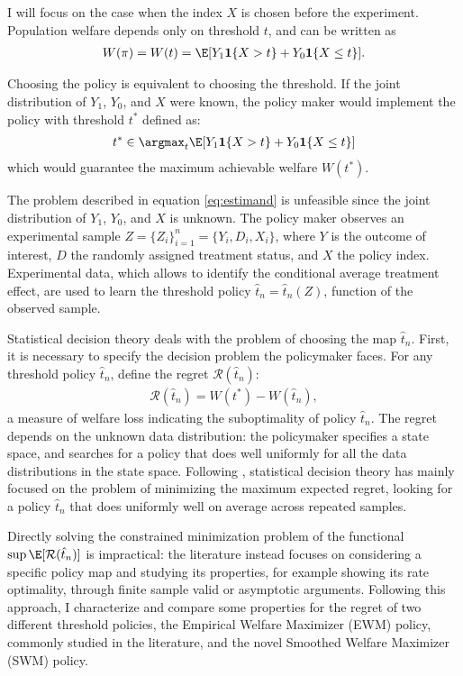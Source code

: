 {I will focus on the case when the index $X$ is chosen before the experiment. Population welfare depends only on threshold $t$, and can be written as
\begin{gather}
    W(\pi) = W(t) = \E[Y_1\mathbf{1}\{X > t\} + Y_0\mathbf{1}\{X \leq t\}]. 
\end{gather}

Choosing the policy is equivalent to choosing the threshold. If the joint distribution of $Y_1$, $Y_0$, and $X$ were known, the policy maker would implement the policy with threshold $t^*$ defined as:
\begin{gather} \label{eq:estimand}
    t^* \in \argmax_{t} \E[Y_1\mathbf{1}\{X> t\} + Y_0\mathbf{1}\{X \leq t\}]
\end{gather}
which would guarantee the maximum achievable welfare $W(t^*)$.

The problem described in equation \eqref{eq:estimand} is unfeasible since the joint distribution of $Y_1$, $Y_0$, and $X$ is unknown. The policy maker observes an experimental sample $Z=\{Z_i\}_{i=1}^n=\{Y_i,D_i,X_i\}$, where $Y$ is the outcome of interest, $D$ the randomly assigned treatment status, and $X$ the policy index. Experimental data, which allows to identify the conditional average treatment effect, are used to learn the threshold policy $\hat{t}_n = \hat{t}_n(Z)$, function of the observed sample.

Statistical decision theory deals with the problem of choosing the map $\hat{t}_n$. First, it is necessary to specify the decision problem the policymaker faces. For any threshold policy $\hat{t}_n$, define the regret $\mathcal{R}(\hat{t}_n)$:
\begin{gather}
    \mathcal{R}(\hat{t}_n) = W(t^*) - W(\hat{t}_n),
\end{gather}
a measure of welfare loss indicating the suboptimality of policy $\hat{t}_n$. The regret depends on the unknown data distribution: the policymaker specifies a state space, and searches for a policy that does well uniformly for all the data distributions in the state space. Following \cite{manski2004statistical}, statistical decision theory has mainly focused on the problem of minimizing the maximum expected regret, looking for a policy $\hat{t}_n$ that does uniformly well on average across repeated samples.

Directly solving the constrained minimization problem of the functional $\sup \E[\mathcal{R}(\hat{t}_n)]$ is impractical: the literature instead focuses on considering a specific policy map and studying its properties, for example showing its rate optimality, through finite sample valid \citep{kitagawa2018should} or asymptotic \citep{athey2021policy} arguments. Following this approach, I characterize and compare some properties for the regret of two different threshold policies, the Empirical Welfare Maximizer (EWM) policy, commonly studied in the literature, and the novel Smoothed Welfare Maximizer (SWM) policy.

}

